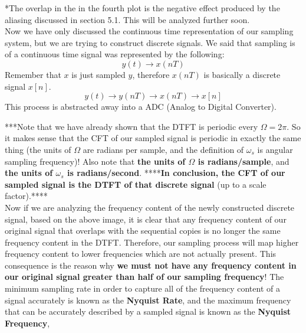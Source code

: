 \documentclass[a4paper]{article}
\numberwithin{equation}{section}
\begin{document}
*The overlap in the in the fourth plot is the negative effect produced by the aliasing discussed in section 5.1. This will be analyzed further soon. \\

Now we have only discussed the continuous time representation of our sampling system, but we are trying to construct discrete signals.
We said that sampling is of a continuous time signal was represented by the following:
\begin{equation}
y(t) \rightarrow x(nT)
\end{equation}
Remember that $x$ is just sampled $y$, therefore $x(nT)$ is basically a discrete signal $x[n]$.
\begin{equation}
y(t) \rightarrow y(nT) \rightarrow x(nT) \rightarrow x[n]
\end{equation}
This process is abstracted away into a ADC (Analog to Digital Converter).
\begin{center}
\end{center}
***Note that we have already shown that the DTFT is periodic every $\Omega=2\pi$. So it makes sense that the CFT of our sampled signal is periodic in exactly the same thing (the units of $\Omega$ are radians per sample, and the definition of $\omega_s$ is angular sampling frequency)! Also note that \textbf{the units of $\Omega$ is radians/sample}, and \textbf{the units of $\omega_s$ is radians/second}. ****\textbf{In conclusion, the CFT of our sampled signal is the DTFT of that discrete signal} (up to a scale factor).****\\

Now if we are analyzing the frequency content of the newly constructed discrete signal, based on the above image, it is clear that any frequency content of our original signal that overlaps with the sequential copies is no longer the same frequency content in the DTFT. Therefore, our sampling process will map higher frequency content to lower frequencies which are not actually present. This consequence is the reason why \textbf{we must not have any frequency content in our original signal greater than half of our sampling frequency}! The minimum sampling rate in order to capture all of the frequency content of a signal accurately is known as the \textbf{Nyquist Rate}, and the maximum frequency that can be accurately described by a sampled signal is known as the \textbf{Nyquist Frequency},
\end{document}
